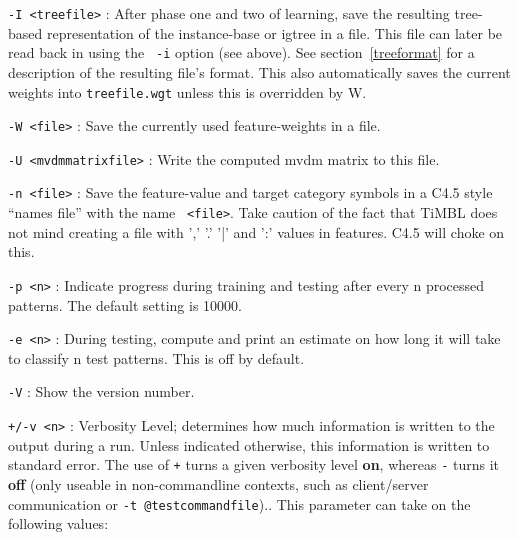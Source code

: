 \documentclass{report}
\begin{document}
\begin{description}

\item {\tt -I <treefile>} : After phase one and two of learning, save
the resulting tree-based representation of the instance-base or {\sc
igtree} in a file. This file can later be read back in using the {\tt
-i} option (see above). See section~\ref{treeformat} for a description
of the resulting file's format. This also automatically saves the
current weights into {\tt treefile.wgt} unless this is overridden by
{\-W}.

\item {\tt -W <file>} : Save the currently used feature-weights in a
file.

\item {\tt -U <mvdmmatrixfile>} : Write the computed {\sc mvdm} matrix to
this file.

\item {\tt -n <file>} : Save the feature-value and target category
symbols in a C4.5 style ``names file'' with the name {\tt
<file>}. Take caution of the fact that TiMBL does not mind creating a
file with ',' '.' '|' and ':' values in features. C4.5 will choke on this.

\item {\tt -p <n>} : Indicate progress during training and testing
after every n processed patterns. The default setting is 10000.

\item {\tt -e <n>} : During testing, compute and print an estimate on
how long it will take to classify n test patterns. This is off by
default.

\item {\tt -V} : Show the version number.

\item {\tt +/-v <n>} : Verbosity Level; determines how much
information is written to the output during a run. Unless indicated
otherwise, this information is written to standard error. The use of
{\tt +} turns a given verbosity level {\bf on}, whereas {\tt -} turns
it {\bf off} (only useable in non-commandline contexts, such as
client/server communication or {\tt -t @testcommandfile}).. This
parameter can take on the following values:


\end{description}
\end{document}
